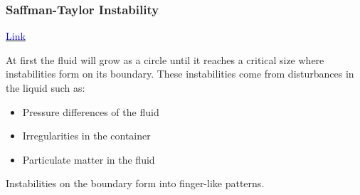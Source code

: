 \documentclass{beamer}
\begin{document}


\begin{frame}
\frametitle{Saffman-Taylor Instability}
\begin{minipage}{.40\textwidth}
\caption{\href{https://www.youtube.com/watch?v=DUzdQU6uoeE}{\underline{\textcolor{blue}{Link}}}}
\end{minipage}
\begin{minipage}{.55\textwidth}
At first the fluid will grow as a circle until it reaches a critical size where instabilities form on its boundary.
These instabilities come from disturbances in the liquid such as:
\begin{itemize}
    \item Pressure differences of the fluid
    \item Irregularities in the container
    \item Particulate matter in the fluid
\end{itemize}
Instabilities on the boundary form into finger-like patterns.
\end{minipage}

\end{frame}
\end{document}
